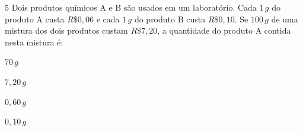 
\num{5}  Dois produtos químicos A e B são usados em um laboratório. Cada $1\,g$ do
produto A custa $R\$0,06$ e cada $1\,g$ do produto B custa
$R\$0,10$. Se $100\,g$ de uma mistura dos dois produtos custam $R\$7,20$, a
quantidade do produto A contida nesta mistura é:

\begin{escolha}
\item $70\,g$
\item $7,20\,g$
\item $0,60\,g$
\item $0,10\,g$
\end{escolha}



